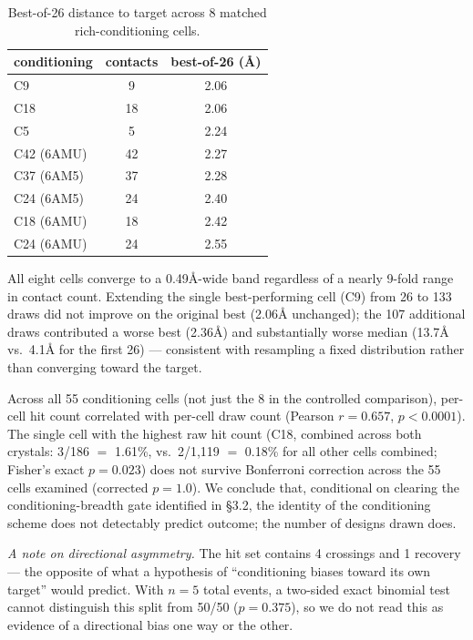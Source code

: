 \documentclass[letterpaper]{article}
\begin{document}
\begin{table}[t]
\centering
\small
\begin{tabular}{lcc}
\toprule
conditioning & contacts & best-of-26 (\AA{}) \\
\midrule
C9 & 9 & 2.06 \\
C18 & 18 & 2.06 \\
C5 & 5 & 2.24 \\
C42 (6AMU) & 42 & 2.27 \\
C37 (6AM5) & 37 & 2.28 \\
C24 (6AM5) & 24 & 2.40 \\
C18 (6AMU) & 18 & 2.42 \\
C24 (6AMU) & 24 & 2.55 \\
\bottomrule
\end{tabular}
\caption{Best-of-26 distance to target across 8 matched rich-conditioning cells.}
\label{tab:best26}
\end{table}

All eight cells converge to a 0.49\AA{}-wide band regardless of a nearly 9-fold range in contact count.
Extending the single best-performing cell (C9) from 26 to 133 draws did not improve on the original best
(2.06\AA{} unchanged); the 107 additional draws contributed a worse best (2.36\AA{}) and substantially
worse median (13.7\AA{} vs.\ 4.1\AA{} for the first 26) --- consistent with resampling a fixed distribution
rather than converging toward the target.

Across all 55 conditioning cells (not just the 8 in the controlled comparison), per-cell hit count
correlated with per-cell draw count (Pearson $r=0.657$, $p<0.0001$). The single cell with the highest raw
hit count (C18, combined across both crystals: 3/186 $=$ 1.61\%, vs.\ 2/1{,}119 $=$ 0.18\% for all other
cells combined; Fisher's exact $p=0.023$) does not survive Bonferroni correction across the 55 cells
examined (corrected $p=1.0$). We conclude that, conditional on clearing the conditioning-breadth gate
identified in \S3.2, the identity of the conditioning scheme does not detectably predict outcome; the
number of designs drawn does.

\textit{A note on directional asymmetry.} The hit set contains 4 crossings and 1 recovery --- the opposite
of what a hypothesis of ``conditioning biases toward its own target'' would predict. With $n=5$ total
events, a two-sided exact binomial test cannot distinguish this split from 50/50 ($p=0.375$), so we do not
read this as evidence of a directional bias one way or the other.
\end{document}
